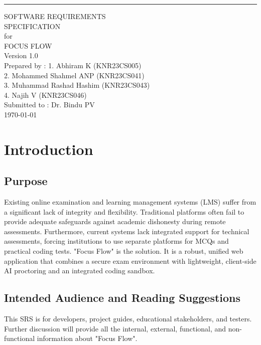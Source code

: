 \documentclass{scrreprt}
\date{}
\def\myversion{1.0 }
\begin{document}
\begin{flushright}
    \rule{16cm}{5pt}\vskip1cm
    \begin{bfseries}
        \Huge{SOFTWARE REQUIREMENTS\\ SPECIFICATION}\\
        \vspace{1.5cm}
        for\\
        \vspace{1.5cm}
        FOCUS FLOW\\
        \vspace{1.5cm}
        \LARGE{Version \myversion}\\
        \vspace{1.5cm}
        Prepared by : 1. Abhiram K (KNR23CS005)\\
        2. Mohammed Shahmel ANP (KNR23CS041)\\
        3. Muhammad Rashad Hashim (KNR23CS043)\\
        4. Najih V (KNR23CS046)\\
        \vspace{1.5cm}
        Submitted to : Dr. Bindu PV\\
        \vspace{1.5cm}
        \today\\
    \end{bfseries}
\end{flushright}

\tableofcontents

\chapter{Introduction}

\section{Purpose}
Existing online examination and learning management systems (LMS) suffer from a significant lack of integrity and flexibility. Traditional platforms often fail to provide adequate safeguards against academic dishonesty during remote assessments. Furthermore, current systems lack integrated support for technical assessments, forcing institutions to use separate platforms for MCQs and practical coding tests. "Focus Flow" is the solution. It is a robust, unified web application that combines a secure exam environment with lightweight, client-side AI proctoring and an integrated coding sandbox.

\section{Intended Audience and Reading Suggestions}
This SRS is for developers, project guides, educational stakeholders, and testers. Further discussion will provide all the internal, external, functional, and non-functional information about "Focus Flow".
\end{document}
